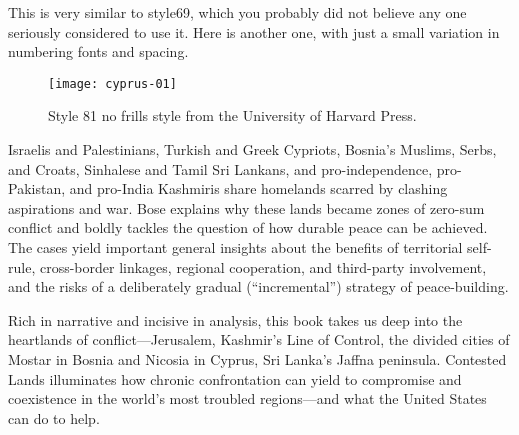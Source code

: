 This is very similar to style69, which you probably did not believe any one seriously considered to use it. Here is another one, with just a small variation in numbering fonts and spacing. 

\begin{figure}[ht]
\centering
\texttt{[image: cyprus-01]}
\caption{Style 81 no frills style from the University of Harvard Press.}
\end{figure}

Israelis and Palestinians, Turkish and Greek Cypriots, Bosnia’s Muslims, Serbs, and Croats, Sinhalese and Tamil Sri Lankans, and pro-independence, pro-Pakistan, and pro-India Kashmiris share homelands scarred by clashing aspirations and war. Bose explains why these lands became zones of zero-sum conflict and boldly tackles the question of how durable peace can be achieved. The cases yield important general insights about the benefits of territorial self-rule, cross-border linkages, regional cooperation, and third-party involvement, and the risks of a deliberately gradual (“incremental”) strategy of peace-building.

Rich in narrative and incisive in analysis, this book takes us deep into the heartlands of conflict---Jerusalem, Kashmir’s Line of Control, the divided cities of Mostar in Bosnia and Nicosia in Cyprus, Sri Lanka’s Jaffna peninsula. Contested Lands illuminates how chronic confrontation can yield to compromise and coexistence in the world’s most troubled regions—and what the United States can do to help.


